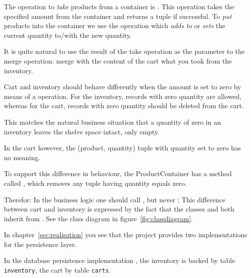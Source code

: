The operation to \textit{take} products from a container is
. This operation takes the specified amount from
the container and returns a  tuple if successful. 
To \textit{put} products into the container we use the
 operation which \textit{adds to}
or \textit{sets} the current quantity to/with the new quantity. 

It is quite natural to use the result of the take operation as the parameter to the merge operation:
merge with the content of the cart what you took from the inventory.
 
Cart and inventory should behave differently when the amount is
set to zero by means of a  operation. For the inventory, records
with zero quantity are allowed, whereas for the cart, records with zero
quantity should be deleted from the cart.

This matches the natural business situation that a quantity of zero in
an inventory leaves the shelve space intact, only empty.

In the cart however, the (product, quantity) tuple with quantity set to
zero has no meaning. 

To support this difference in behaviour, the ProductContainer has a method
called , which removes any tuple having quantity equals
zero.

Therefor: In the business logic one should call , but never ;
This difference between cart and inventory is expressed by the fact
that the classes  and  both inherit from
. See the class diagram in
figure~\ref{fig:classdiagram}.


In chapter~\ref{sec:realisation} you see that the project provides two
implementations for the persistence layer.

In the database persistence implementation , the inventory is backed by table
\texttt{inventory}, the cart by table \texttt{carts}.
